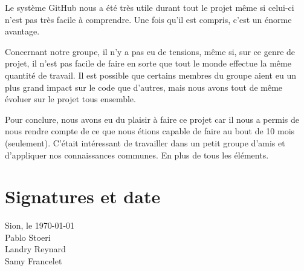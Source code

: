 Le système GitHub nous a été très utile durant tout le projet même si celui-ci n’est pas très facile à comprendre. Une fois qu’il est compris, c’est un énorme avantage.

Concernant notre groupe, il n’y a pas eu de tensions, même si, sur ce genre de projet, il n’est pas facile de faire en sorte que tout le monde effectue la même quantité de travail. Il est possible que certains membres du groupe aient eu un plus grand impact sur le code que d’autres, mais nous avons tout de même évoluer sur le projet tous ensemble.

Pour conclure, nous avons eu du plaisir à faire ce projet car il nous a permis de nous rendre compte de ce que nous étions capable de faire au bout de 10 mois (seulement). C’était intéressant de travailler dans un petit groupe d’amis et d’appliquer nos connaissances communes. En plus de tous les éléments.


\section{Signatures et date}

Sion, le \today \\

{\raggedleft
Pablo Stoeri\\[2cm]

Landry Reynard\\[2cm]

Samy Francelet\\[2cm]
}
